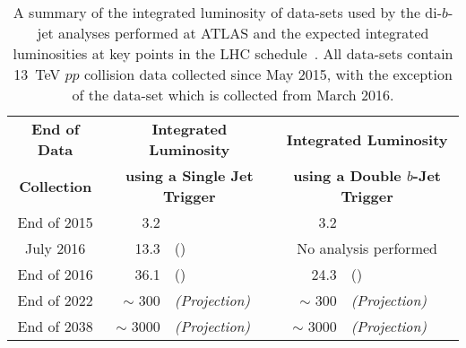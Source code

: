 {\renewcommand{\arraystretch}{1.2}
\begin{table}[!htb]
\centering
\begin{tabular}{|c|r l|r l|}
  \hline
\textbf{End of Data}       &  \multicolumn{2}{c|}{\textbf{Integrated Luminosity}}         &   \multicolumn{2}{c|}{\textbf{Integrated Luminosity}}           \\
\textbf{Collection}        &  \multicolumn{2}{c|}{\textbf{using a Single Jet Trigger}}    &   \multicolumn{2}{c|}{\textbf{using a Double $b$-Jet Trigger}}  \\
\hline                                                                    
End of 2015       &  3.2 \ifb{} & \cite{dibjet-mori16_paper}            &  3.2 \ifb{}           & \cite{dibjet-lhcp_conf}          \\
July  2016        & 13.3 \ifb{} & \cite{dibjet-ichep_conf} (\summer{})  &  \multicolumn{2}{c|}{No analysis performed}              \\
End of 2016       & 36.1 \ifb{} & (\hm{})                               &  24.3 \ifb{}          & (\lm{})                          \\
End of 2022       & $\sim$ 300 \ifb{} &  \textit{(Projection)}          &  $\sim$ 300  \ifb{}   &  \textit{(Projection)}           \\
End of 2038       & $\sim$ 3000 \ifb{} & \textit{(Projection)}          &  $\sim$ 3000 \ifb{}   &  \textit{(Projection)}           \\
\hline
\end{tabular}
\caption[A summary of the integrated luminosity of data-sets used by the di-$b$-jet analyses performed at ATLAS and the expected integrated luminosities at key points in the LHC schedule]
        {A summary of the integrated luminosity of data-sets used by the di-$b$-jet analyses performed at ATLAS and the expected integrated luminosities at key points in the LHC schedule~\cite{fut-lhc-shedule}.
          All data-sets contain 13~TeV $pp$ collision data collected since May 2015,
          with the exception of the \lm{} data-set which is collected from March 2016.
        }
\label{tab:fut-lumi}
\end{table}}

